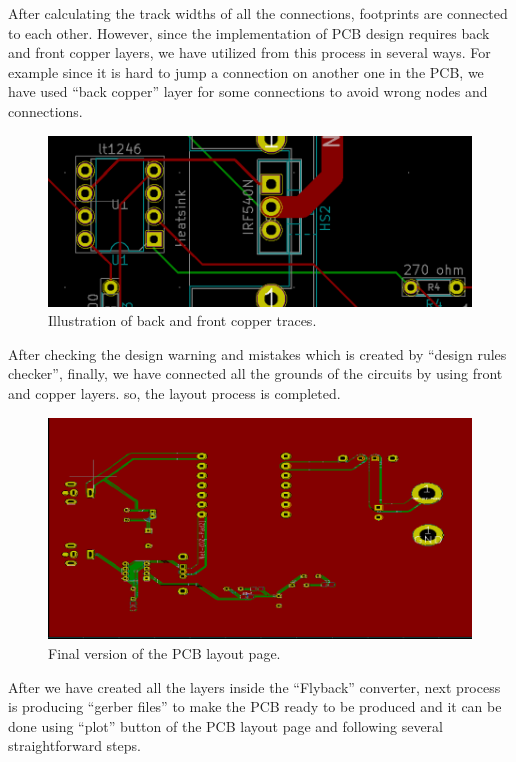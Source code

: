 \documentclass{article}
\begin{document}
After calculating the track widths of all the connections, footprints are connected to each other. However, since the implementation of PCB design requires back and front copper layers, we have utilized from this process in several ways. For example since it is hard to jump a connection on another one in the PCB, we have used “back copper” layer for some connections to avoid wrong nodes and connections.
\begin{figure}[H]
    \centering
    \includegraphics[scale=0.9]{PCB6.png}
    \caption{Illustration of back and front copper traces.}
    \label{fig:my_label}
\end{figure}
After checking the design warning and mistakes which is created by “design rules checker”, finally, we have connected all the grounds of the circuits by using front and copper layers. so, the layout process is completed.


\begin{figure}[H]
    \centering
    \includegraphics[scale=0.9]{PCB7.png}
    \caption{Final version of the PCB layout page. }
    \label{fig:my_label}
\end{figure}



After we have created all the layers inside the “Flyback” converter, next process is producing “gerber files” to make the PCB ready to be produced and it can be done using “plot” button of the PCB layout page and following several straightforward steps.
\end{document}
